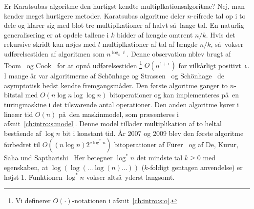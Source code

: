 Er Karatsubas algoritme den hurtigst kendte multiplkationsalgoritme?
Nej, man kender meget hurtigere metoder.
Karatsubas algoritme deler $n$-cifrede tal op i to dele og klarer sig med blot tre multiplkationer af halvt så lange tal.
En naturlig generalisering er at opdele tallene i $k$ bidder af længde omtrent $n/k$. 
Hvis det rekursive skridt kan nøjes med $l$ multiplkationer af tal af længde $n/k$, så vokser udførelsestiden af algoritmen som $n^{\log_k \ell}$. 
Denne observation nblev brugt af Toom~\cite{Toom} og Cook~\cite{Cook} for at opnå udførelsestiden
\footnote{Vi definerer $O(\cdot)$-notationen i afsnit~\protect\ref{ch:intro:s:o}.}  
$O(n^{ 1 + \epsilon})$ for vilkårligt positivt~$\epsilon$. 
I mange år var algoritmerne af Sch\"{o}nhage og Strassen~\cite{SchStr71}
 og
Sch\"{o}nhage~\cite{Schoenhage} de asymptotisk bedst kendte fremgangsmåder. 
Den første algoritme ganger to $n$-bitstal med $O(n \log n \log\log n)$ bitoperationer og kan implementeres på en turingmaskine i det tilsvarende antal operationer.
Den anden algoritme kører i lineær tid $O(n)$ på den maskinmodel, som præsenteres i afsnit~\ref{ch:intro:s:model}.
Denne model tillader multiplikation af to heltal bestående af $\log n$ bit i konstant tid.
År 2007 og 2009 blev den første algoritme forbedret til  $O((n \log n) 2^{c\log^* n})$ bitoperationer af
F{\"u}rer~\cite{Furer09}
og af De, Kurur, Saha und Saptharishi~\cite{DeKSS13}
%
Her betegner $\log^*n$  det mindste tal $k\ge0$ med egenskaben, at $\log(\log(\dots\log(n)\dots))$ ($k$-foldigt gentagen anvendelse) er højst $1$.
Funktionen $\log^*n$ vokser altså yderst langsomt.
 

